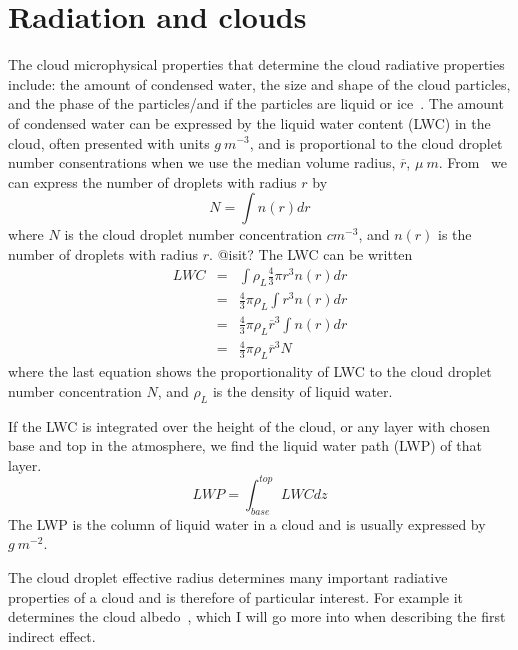 \section{Radiation and clouds}
The cloud microphysical properties that determine the cloud radiative properties include: the amount of condensed water, the size and shape of the cloud particles, and the phase of the particles/and if the particles are liquid or ice~\citep{Curry1996}. The amount of condensed water can be expressed by the liquid water content (LWC) in the cloud, often presented with units $g~m^{-3}$, and is proportional to the cloud droplet number consentrations when we use the median volume radius, $\overline{r}$, $\mu~m$. From~\citet{Rogers1989} we can express the number of droplets with radius $r$ by
\begin{equation}
N = \int n(r) dr
\end{equation}
where $N$ is the cloud droplet number concentration $cm^{-3}$, and $n(r)$ is the number of droplets with radius $r$. @isit?
The LWC can be written
\begin{eqnarray}
LWC &=& \int \rho_L \frac{4}{3} \pi r^3 n(r) dr\\
&=& \frac{4}{3} \pi \rho_L \int r^3 n(r) dr\\
&=& \frac{4}{3} \pi \rho_L \overline{r}^3 \int n(r) dr\\
&=& \frac{4}{3} \pi \rho_L \overline{r}^3 N 
\end{eqnarray}
where the last equation shows the proportionality of LWC to the cloud droplet number concentration $N$, and $\rho_L$ is the density of liquid water.

If the LWC is integrated over the height of the cloud, or any layer with chosen base and top in the atmosphere, we find the liquid water path (LWP) of that layer.
\begin{equation}
LWP = \int_{base}^{top} LWC dz
\end{equation}
The LWP is the column of liquid water in a cloud and is usually expressed by $g~m^{-2}$.


The cloud droplet effective radius determines many important radiative properties of a cloud and is therefore of particular interest. For example it determines the cloud albedo~\citep{Hansen1974}, which I will go more into when describing the first indirect effect.


